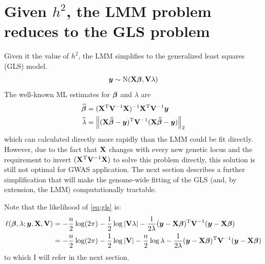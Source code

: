 




\section{Given \texorpdfstring{$h^2$}{h-squared}, the LMM problem reduces to the GLS problem}

Given it the value of $h^2$, the LMM simplifies to the generalized least squares (GLS) model.
\begin{align}
  \bm{y} \sim \mathrm{N}(\mathbf{X}\boldsymbol{\beta}, \mathbf{V} \lambda)     \label{eq:gls}
\end{align}
The well-known ML estimates for $\boldsymbol{\beta}$ and $\lambda$ are
\begin{align}
  \widehat{\boldsymbol{\beta}}    &= (\mathbf{X} ^\mathrm{T} \mathbf{V} ^{-1} \mathbf{X}) ^{-1} \mathbf{X} ^\mathrm{T} \mathbf{V} ^{-1} \bm{y}\\
  \widehat{\lambda}   &= \left\lVert(\mathbf{X}\widehat{\boldsymbol{\beta}} - \bm{y})^\mathrm{T} \mathbf{V}^{-1} (\mathbf{X}\widehat{\boldsymbol{\beta}} - \bm{y})\right\rVert_{2}
\end{align}
which can calculated directly more rapidly than the LMM could be fit directly.
However, due to the fact that $\mathbf{X}$ changes with every new genetic locus and the requirement to invert $(\mathbf{X} ^\mathrm{T} \mathbf{V} ^{-1} \mathbf{X})$ to solve this problem directly, this solution is still not optimal for GWAS application.
The next section describes a further simplification that will make the genome-wide fitting of the GLS (and, by extension, the LMM) computationally tractable.

Note that the likelihood of \cref{eq:gls} is:
\begin{align}
    \ell(\boldsymbol{\beta}, \lambda; \bm{y}, \mathbf{X}, \mathbf{V}) &= 
        -\frac{n}{2}\log(2\pi)
        -\frac{1}{2}\log|\mathbf{V}\lambda|
        -           \frac{1}{2\lambda}
            (\bm{y}-\mathbf{X}\boldsymbol{\beta})^\mathrm{T}\mathbf{V}^{-1}(\bm{y}-\mathbf{X}\boldsymbol{\beta}) \\
    &= 
        -\frac{n}{2}\log(2\pi)
        -\frac{1}{2}\log|\mathbf{V}|
        -\frac{n}{2}\log\lambda
        - \frac{1}{2\lambda}
            (\bm{y}-\mathbf{X}\boldsymbol{\beta})^\mathrm{T}\mathbf{V}^{-1}(\bm{y}-\mathbf{X}\boldsymbol{\beta}) \label{eq:lmm_loglik}
\end{align}
to which I will refer in the next section.

